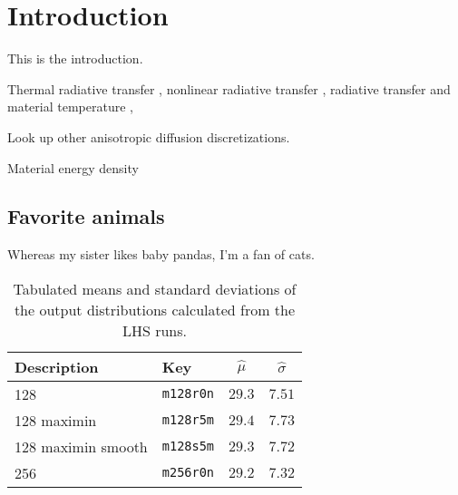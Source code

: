 
\chapter{Introduction}
This is the introduction.

Thermal radiative transfer \cite{Urb2006,McC2008a}, nonlinear radiative transfer
\cite{Den2009}, radiative transfer and material temperature
\cite{Gen2001,Mor2000}, 

Look up other anisotropic diffusion discretizations.

Material energy density \cite{Su2001}

\section{Favorite animals}
Whereas my sister likes baby pandas, I'm a fan of cats.
\begin{table}[htb]
  \centering
\begin{tabular}{llcc}
\toprule
 Description & Key & $\hat\mu$ & $\hat\sigma$ 
\\ \midrule
128                 & \texttt{m128r0n}  & $29.3$ & $7.51$
 \\
128 maximin         & \texttt{m128r5m}  & $29.4$ & $7.73$
 \\
128 maximin smooth  & \texttt{m128s5m}  & $29.3$ & $7.72$
 \\
256                 & \texttt{m256r0n}  & $29.2$ & $7.32$
 \\
\bottomrule
\end{tabular}
  \caption[LHS run results]{Tabulated means and standard deviations of the output distributions calculated from the LHS runs.}
  \label{tab:distribution}
\end{table}

